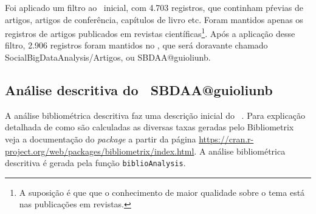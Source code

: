 Foi aplicado um filtro ao \dataset\ inicial, com 4.703 registros, que continham pŕevias de artigos, artigos de conferência, capítulos de livro etc. Foram mantidos apenas os registros de artigos publicados em revistas científicas\footnote{A suposição é que que o conhecimento de maior qualidade sobre o tema está nas publicações em revistas.}. Após a aplicação desse filtro, 2.906 registros foram mantidos no \dataset, que será doravante chamado SocialBigDataAnalysis/Artigos, ou SBDAA@guioliunb.

\subsection{Análise descritiva do \dataset\   SBDAA@guioliunb}

A análise bibliométrica descritiva faz uma descrição inicial do \dataset\  . Para explicação detalhada de como são calculadas as diversas taxas geradas pelo Bibliometrix veja a documentação do \textit{package} a partir da página \url{https://cran.r-project.org/web/packages/bibliometrix/index.html}. A análise bibliométrica descritiva é gerada pela função \texttt{biblioAnalysis}.

